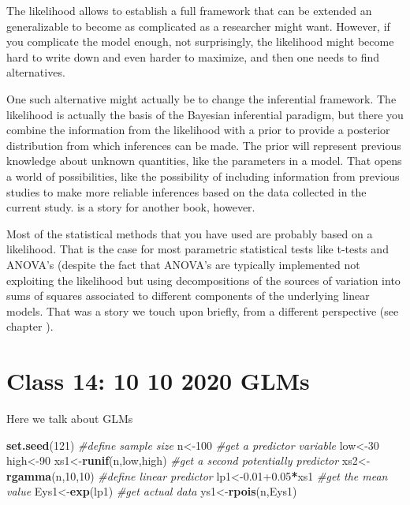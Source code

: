 \documentclass[
]{book}
\newenvironment{Shaded}{\begin{snugshade}}{\end{snugshade}}
\newcommand{\CommentTok}[1]{\textcolor[rgb]{0.56,0.35,0.01}{\textit{#1}}}
\newcommand{\DecValTok}[1]{\textcolor[rgb]{0.00,0.00,0.81}{#1}}
\newcommand{\FloatTok}[1]{\textcolor[rgb]{0.00,0.00,0.81}{#1}}
\newcommand{\KeywordTok}[1]{\textcolor[rgb]{0.13,0.29,0.53}{\textbf{#1}}}
\newcommand{\NormalTok}[1]{#1}
\newcommand{\OperatorTok}[1]{\textcolor[rgb]{0.81,0.36,0.00}{\textbf{#1}}}
\begin{document}
The likelihood allows to establish a full framework that can be extended an generalizable to become as complicated as a researcher might want. However, if you complicate the model enough, not surprisingly, the likelihood might become hard to write down and even harder to maximize, and then one needs to find alternatives.

One such alternative might actually be to change the inferential framework. The likelihood is actually the basis of the Bayesian inferential paradigm, but there you combine the information from the likelihood with a prior to provide a posterior distribution from which inferences can be made. The prior will represent previous knowledge about unknown quantities, like the parameters in a model. That opens a world of possibilities, like the possibility of including information from previous studies to make more reliable inferences based on the data collected in the current study. is a story for another book, however.

Most of the statistical methods that you have used are probably based on a likelihood. That is the case for most parametric statistical tests like t-tests and ANOVA's (despite the fact that ANOVA's are typically implemented not exploiting the likelihood but using decompositions of the sources of variation into sums of squares associated to different components of the underlying linear models. That was a story we touch upon briefly, from a different perspective (see chapter ).

\hypertarget{aula14}{%
\chapter{Class 14: 10 10 2020 GLMs}\label{aula14}}

Here we talk about GLMs

\begin{Shaded}
\begin{Highlighting}[]
\KeywordTok{set.seed}\NormalTok{(}\DecValTok{121}\NormalTok{)}
\CommentTok{#define sample size}
\NormalTok{n<-}\DecValTok{100}
\CommentTok{#get a predictor variable}
\NormalTok{low<-}\DecValTok{30}
\NormalTok{high<-}\DecValTok{90}
\NormalTok{xs1<-}\KeywordTok{runif}\NormalTok{(n,low,high)}
\CommentTok{#get a second potentially predictor}
\NormalTok{xs2<-}\KeywordTok{rgamma}\NormalTok{(n,}\DecValTok{10}\NormalTok{,}\DecValTok{10}\NormalTok{)}
\CommentTok{#define linear predictor}
\NormalTok{lp1<-}\FloatTok{0.01+0.05}\OperatorTok{*}\NormalTok{xs1}
\CommentTok{#get the mean value}
\NormalTok{Eys1<-}\KeywordTok{exp}\NormalTok{(lp1)}
\CommentTok{#get actual data}
\NormalTok{ys1<-}\KeywordTok{rpois}\NormalTok{(n,Eys1)}
\end{Highlighting}
\end{Shaded}
\end{document}
